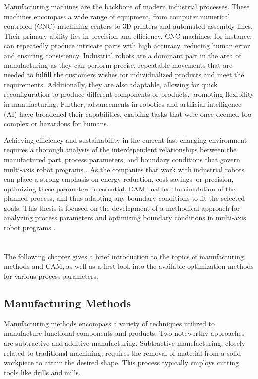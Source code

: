 \documentclass[ZLstudentexpose%
              ,optBiber%
              ,optEnglish%
              ,10pt
              ]{ZLlatex}%
\begin{document}
Manufacturing machines are the backbone of modern industrial processes. These machines encompass a wide range of equipment, from computer numerical controled (CNC) machining centers to 3D printers and automated assembly lines. Their primary ability lies in precision and efficiency. CNC machines, for instance, can repeatedly produce intricate parts with high accuracy, reducing human error and ensuring consistency. \newline
Industrial robots are a dominant part in the area of manufacturing as they can perform precise, repeatable movements that are needed to fulfill the customers wishes for individualized products and meet the requirements. Additionally, they are also adaptable, allowing for quick reconfiguration to produce different components or products, promoting flexibility in manufacturing. Further, advancements in robotics and artificial intelligence (AI) have broadened their capabilities, enabling tasks that were once deemed too complex or hazardous for humans. \newline

Achieving efficiency and sustainability in the current fast-changing environment requires a thorough analysis of the interdependent relationships between the manufactured part, process parameters, and boundary conditions that govern multi-axis robot programs \cite{Pan}. As the companies that work with industrial robots can place a strong emphasis on energy reduction, cost savings, or precision, optimizing these parameters is essential. CAM enables the simulation of the planned process, and thus adapting any boundary conditions to fit the selected goals.
This thesis is focused on the development of a methodical approach for analyzing process parameters and optimizing boundary conditions in multi-axis robot programs \cite{Pan}. 

\section{}%
The following chapter gives a brief introduction to the topics of manufacturing methods and CAM, as well as a first look into the available optimization methods for various process parameters.  
\subsection{Manufacturing Methods}
Manufacturing methods encompass a variety of techniques utilized to manufacture functional components and products. Two noteworthy approaches are subtractive and additive manufacturing. Subtractive manufacturing, closely related to traditional machining, requires the removal of material from a solid workpiece to attain the desired shape. This process typically employs cutting tools like drills and mills.
\end{document}
